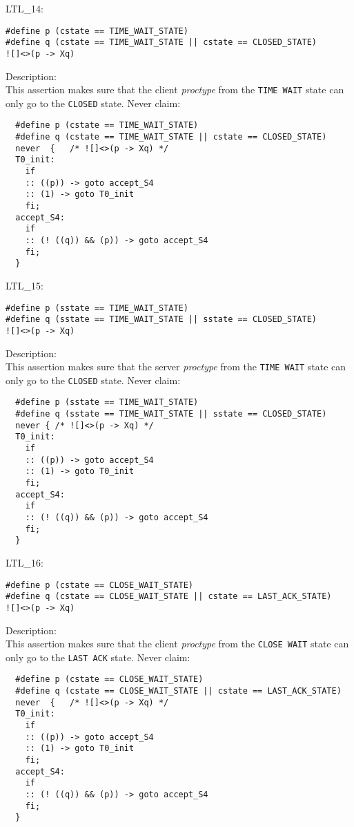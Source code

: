 \documentclass{WigReport}
\begin{document}
LTL\_14:\\
\begin{lstlisting}
#define p (cstate == TIME_WAIT_STATE)
#define q (cstate == TIME_WAIT_STATE || cstate == CLOSED_STATE)
![]<>(p -> Xq)
\end{lstlisting}
Description:\\
This assertion makes sure that the client \textit{proctype} from the
\verb|TIME WAIT| state can only go to the \verb|CLOSED| state.
Never claim:\\
\begin{lstlisting}
  #define p (cstate == TIME_WAIT_STATE)
  #define q (cstate == TIME_WAIT_STATE || cstate == CLOSED_STATE)
  never  {   /* ![]<>(p -> Xq) */
  T0_init:
    if
    :: ((p)) -> goto accept_S4
    :: (1) -> goto T0_init
    fi;
  accept_S4:
    if
    :: (! ((q)) && (p)) -> goto accept_S4
    fi;
  }
\end{lstlisting}


LTL\_15:\\
\begin{lstlisting}
#define p (sstate == TIME_WAIT_STATE)
#define q (sstate == TIME_WAIT_STATE || sstate == CLOSED_STATE)
![]<>(p -> Xq)
\end{lstlisting}
Description:\\
This assertion makes sure that the server \textit{proctype} from the
\verb|TIME WAIT| state can only go to the \verb|CLOSED| state.
Never claim:\\
\begin{lstlisting}
  #define p (sstate == TIME_WAIT_STATE)
  #define q (sstate == TIME_WAIT_STATE || sstate == CLOSED_STATE)
  never { /* ![]<>(p -> Xq) */
  T0_init:
    if
    :: ((p)) -> goto accept_S4
    :: (1) -> goto T0_init
    fi;
  accept_S4:
    if
    :: (! ((q)) && (p)) -> goto accept_S4
    fi;
  }
\end{lstlisting}


LTL\_16:\\
\begin{lstlisting}
#define p (cstate == CLOSE_WAIT_STATE)
#define q (cstate == CLOSE_WAIT_STATE || cstate == LAST_ACK_STATE)
![]<>(p -> Xq)
\end{lstlisting}
Description:\\
This assertion makes sure that the client \textit{proctype} from the
\verb|CLOSE WAIT| state can only go to the \verb|LAST ACK| state.
Never claim:\\
\begin{lstlisting}
  #define p (cstate == CLOSE_WAIT_STATE)
  #define q (cstate == CLOSE_WAIT_STATE || cstate == LAST_ACK_STATE)
  never  {   /* ![]<>(p -> Xq) */
  T0_init:
    if
    :: ((p)) -> goto accept_S4
    :: (1) -> goto T0_init
    fi;
  accept_S4:
    if
    :: (! ((q)) && (p)) -> goto accept_S4
    fi;
  }
\end{lstlisting}
\end{document}
